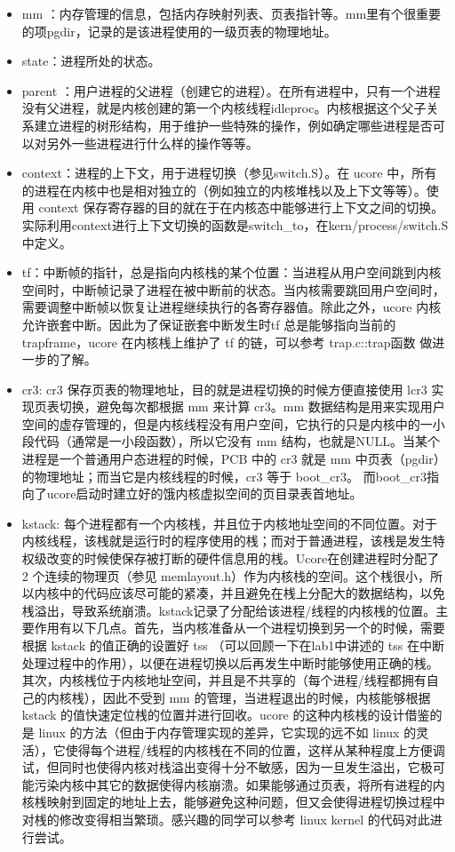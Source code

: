 \begin{itemize}
\item
  mm
  ：内存管理的信息，包括内存映射列表、页表指针等。mm里有个很重要的项pgdir，记录的是该进程使用的一级页表的物理地址。
\item
  state：进程所处的状态。
\item
  parent
  ：用户进程的父进程（创建它的进程）。在所有进程中，只有一个进程没有父进程，就是内核创建的第一个内核线程idleproc。内核根据这个父子关系建立进程的树形结构，用于维护一些特殊的操作，例如确定哪些进程是否可以对另外一些进程进行什么样的操作等等。
\item
  context：进程的上下文，用于进程切换（参见switch.S）。在 ucore
  中，所有的进程在内核中也是相对独立的（例如独立的内核堆栈以及上下文等等）。使用
  context
  保存寄存器的目的就在于在内核态中能够进行上下文之间的切换。实际利用context进行上下文切换的函数是switch\_to，在kern/process/switch.S中定义。
\item
  tf：中断帧的指针，总是指向内核栈的某个位置：当进程从用户空间跳到内核空间时，中断帧记录了进程在被中断前的状态。当内核需要跳回用户空间时，需要调整中断帧以恢复让进程继续执行的各寄存器值。除此之外，ucore
  内核允许嵌套中断。因此为了保证嵌套中断发生时tf 总是能够指向当前的
  trapframe，ucore 在内核桟上维护了 tf 的链，可以参考 trap.c::trap函数
  做进一步的了解。
\item
  cr3: cr3 保存页表的物理地址，目的就是进程切换的时候方便直接使用 lcr3
  实现页表切换，避免每次都根据 mm 来计算 cr3。mm
  数据结构是用来实现用户空间的虚存管理的，但是内核线程没有用户空间，它执行的只是内核中的一小段代码（通常是一小段函数），所以它没有
  mm 结构，也就是NULL。当某个进程是一个普通用户态进程的时候，PCB 中的
  cr3 就是 mm 中页表（pgdir）的物理地址；而当它是内核线程的时候，cr3
  等于 boot\_cr3。
  而boot\_cr3指向了ucore启动时建立好的饿内核虚拟空间的页目录表首地址。
\item
  kstack:
  每个进程都有一个内核桟，并且位于内核地址空间的不同位置。对于内核线程，该桟就是运行时的程序使用的桟；而对于普通进程，该桟是发生特权级改变的时候使保存被打断的硬件信息用的桟。Ucore在创建进程时分配了
  2 个连续的物理页（参见
  memlayout.h）作为内核栈的空间。这个桟很小，所以内核中的代码应该尽可能的紧凑，并且避免在桟上分配大的数据结构，以免桟溢出，导致系统崩溃。kstack记录了分配给该进程/线程的内核桟的位置。主要作用有以下几点。首先，当内核准备从一个进程切换到另一个的时候，需要根据
  kstack 的值正确的设置好 tss （可以回顾一下在lab1中讲述的 tss
  在中断处理过程中的作用），以便在进程切换以后再发生中断时能够使用正确的桟。其次，内核桟位于内核地址空间，并且是不共享的（每个进程/线程都拥有自己的内核桟），因此不受到
  mm 的管理，当进程退出的时候，内核能够根据 kstack
  的值快速定位桟的位置并进行回收。ucore 的这种内核桟的设计借鉴的是 linux
  的方法（但由于内存管理实现的差异，它实现的远不如 linux
  的灵活），它使得每个进程/线程的内核桟在不同的位置，这样从某种程度上方便调试，但同时也使得内核对栈溢出变得十分不敏感，因为一旦发生溢出，它极可能污染内核中其它的数据使得内核崩溃。如果能够通过页表，将所有进程的内核桟映射到固定的地址上去，能够避免这种问题，但又会使得进程切换过程中对桟的修改变得相当繁琐。感兴趣的同学可以参考
  linux kernel 的代码对此进行尝试。
\end{itemize}

